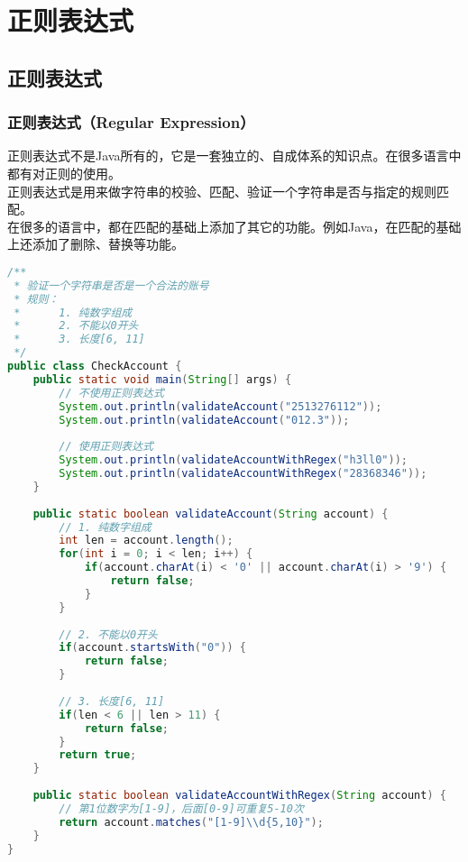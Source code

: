 \chapter{正则表达式}

\section{正则表达式}

\subsection{正则表达式（Regular Expression）}

正则表达式不是Java所有的，它是一套独立的、自成体系的知识点。在很多语言中都有对正则的使用。\\

正则表达式是用来做字符串的校验、匹配、验证一个字符串是否与指定的规则匹配。\\

在很多的语言中，都在匹配的基础上添加了其它的功能。例如Java，在匹配的基础上还添加了删除、替换等功能。\\


\begin{lstlisting}[language=Java]
/**
 * 验证一个字符串是否是一个合法的账号
 * 规则：
 *      1. 纯数字组成
 *      2. 不能以0开头
 *      3. 长度[6, 11]
 */
public class CheckAccount {
    public static void main(String[] args) {
        // 不使用正则表达式
        System.out.println(validateAccount("2513276112"));
        System.out.println(validateAccount("012.3"));
        
        // 使用正则表达式
        System.out.println(validateAccountWithRegex("h3ll0"));
        System.out.println(validateAccountWithRegex("28368346"));
    }
    
    public static boolean validateAccount(String account) {
        // 1. 纯数字组成
        int len = account.length();
        for(int i = 0; i < len; i++) {
            if(account.charAt(i) < '0' || account.charAt(i) > '9') {
                return false;
            }
        }
        
        // 2. 不能以0开头
        if(account.startsWith("0")) {
            return false;
        }
        
        // 3. 长度[6, 11]
        if(len < 6 || len > 11) {
            return false;
        }
        return true;
    }
    
    public static boolean validateAccountWithRegex(String account) {
        // 第1位数字为[1-9]，后面[0-9]可重复5-10次
        return account.matches("[1-9]\\d{5,10}");
    }
}
\end{lstlisting}

